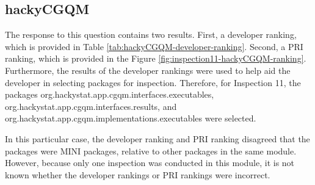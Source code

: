 \clearpage
\subsection{hackyCGQM}
The response to this question contains two results. First, a developer
ranking, which is provided in Table
\ref{tab:hackyCGQM-developer-ranking}. Second, a PRI ranking, which is
provided in the Figure \ref{fig:inspection11-hackyCGQM-ranking}.
Furthermore, the results of the developer rankings were used to help aid
the developer in selecting packages for inspection. Therefore, for
Inspection 11, the packages org.hackystat.app.cgqm.interfaces.executables,
org.hackystat.app.cgqm.interfaces.results, and
org.hackystat.app.cgqm.implementations.executables were selected.

In this particular case, the developer ranking and PRI ranking disagreed
that the packages were MINI packages, relative to other packages in the
same module. However, because only one inspection was conducted in this
module, it is not known whether the developer rankings or PRI rankings were
incorrect.

